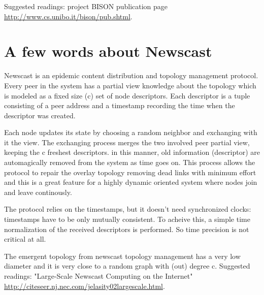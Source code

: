 \documentclass[a4paper,12pt]{article}
\begin{document}
Suggested readings: project BISON publication page \url{http://www.cs.unibo.it/bison/pub.shtml}.


\section{\label{sec:Appendix-B-newscast}A few words about Newscast}

Newscast is an epidemic content distribution and topology management
protocol. Every peer in the system has a partial view knowledge about
the topology which is modeled as a fixed size (c) set of node descriptors.
Each descriptor is a tuple consisting of a peer address and a timestamp
recording the time when the descriptor was created.

Each node updates its state by choosing a random neighbor and exchanging
with it the view. The exchanging process merges the two involved peer
partial view, keeping the c freshest descriptors. in this manner,
old information (descriptor) are automagically removed from the system
as time goes on. This process allows the protocol to repair the overlay
topology removing dead links with minimum effort and this is a great
feature for a highly dynamic oriented system where nodes join and
leave continously. 

The protocol relies on the timestamps, but it doesn't need synchronized
clocks: timestamps have to be only mutually consistent. To acheive
this, a simple time normalization of the received descriptors is performed.
So time precision is not critical at all. 

The emergent topology from newscast topology management has a very
low diameter and it is very close to a random graph with (out) degree
c. Suggested readings: "Large-Scale Newscast Computing on the Internet" \url{http://citeseer.nj.nec.com/jelasity02largescale.html}.
\end{document}
